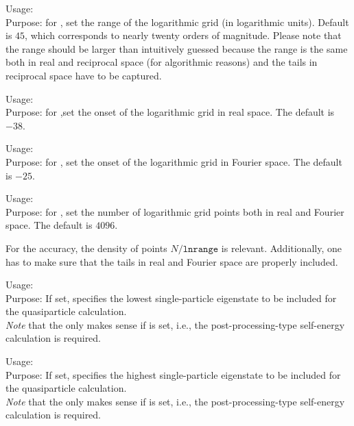 { \noindent
     Usage:   \\[1.0ex] 
     Purpose: for , set the range of the logarithmic grid
     (in logarithmic units).
     Default is $45$, which corresponds to nearly twenty orders of magnitude.
     Please note that the range should be larger than intuitively guessed
     because the range is the same both in real and reciprocal space (for
     algorithmic reasons) and the tails in reciprocal space have to be captured.
}

{ \noindent
     Usage:   \\[1.0ex] 
     Purpose: for ,set the onset of the logarithmic grid
     in real space.  The default is $-38$.
}

{ \noindent
     Usage:   \\[1.0ex] 
     Purpose: for , set the onset of the logarithmic grid
     in Fourier space.  The default is $-25$.
}

{ \noindent
     Usage:   \\[1.0ex] 
     Purpose: for , set the number of logarithmic grid
     points both in real and Fourier space.  The default is $4096$.
}

For the accuracy, the density of points $N/\mathtt{lnrange}$ is relevant.
Additionally, one has to make sure that the tails in real and Fourier space
are properly included.


{ \noindent
  Usage:   \\[1.0ex]
  Purpose: If set, specifies the lowest single-particle eigenstate to be included 
  for the quasiparticle calculation. \\[1.0ex]  
}
\emph{Note} that the  only makes sense if 
 is set, i.e., the post-processing-type self-energy calculation 
is required.

{ \noindent
  Usage:   \\[1.0ex]
  Purpose: If set, specifies the highest single-particle eigenstate to be included 
  for the quasiparticle calculation. \\[1.0ex]  
}
\emph{Note} that the  only makes sense if 
 is set, i.e., the post-processing-type self-energy calculation 
is required.


